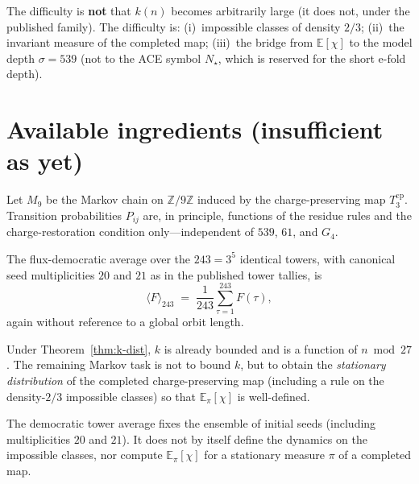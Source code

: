 \begin{remark}
The difficulty is \textbf{not} that \(k(n)\) becomes arbitrarily large (it does
not, under the published family). The difficulty is: (i)~impossible classes of
density \(2/3\); (ii)~the invariant measure of the completed map; (iii)~the
bridge from \(\mathbb{E}[\chi]\) to the model depth \(\sigma=539\)
(not to the ACE symbol \(N_\star\), which is reserved for the short e-fold depth).
\end{remark}

\section{Available ingredients (insufficient as yet)}
\label{sec:ingredients}

\begin{definition}
\label{def:markov9}
Let \(M_9\) be the Markov chain on \(\mathbb{Z}/9\mathbb{Z}\) induced by the
charge-preserving map \(T_3^{\mathrm{cp}}\). Transition probabilities
\(P_{ij}\) are, in principle, functions of the residue rules and the
charge-restoration condition only---independent of \(539\), \(61\), and \(G_4\).
\end{definition}

\begin{definition}
\label{def:dem-avg}
The flux-democratic average over the \(243=3^5\) identical towers, with
canonical seed multiplicities \(20\) and \(21\) as in the published tower
tallies, is
\begin{equation}
\label{eq:dem}
\langle F\rangle_{243}
\;=\;
\frac{1}{243}\sum_{\tau=1}^{243} F(\tau),
\end{equation}
again without reference to a global orbit length.
\end{definition}

\begin{lemma}
\label{lem:markov-insufficient}
Under Theorem~\ref{thm:k-dist}, \(k\) is already bounded and is a function of
\(n\bmod 27\). The remaining Markov task is not to bound \(k\), but to obtain
the \emph{stationary distribution} of the completed charge-preserving map
(including a rule on the density-\(2/3\) impossible classes) so that
\(\mathbb{E}_\pi[\chi]\) is well-defined.
\end{lemma}

\begin{lemma}
\label{lem:dem-insufficient}
The democratic tower average fixes the ensemble of initial seeds (including
multiplicities \(20\) and \(21\)). It does not by itself define the dynamics on
the impossible classes, nor compute \(\mathbb{E}_\pi[\chi]\) for a stationary
measure \(\pi\) of a completed map.
\end{lemma}

